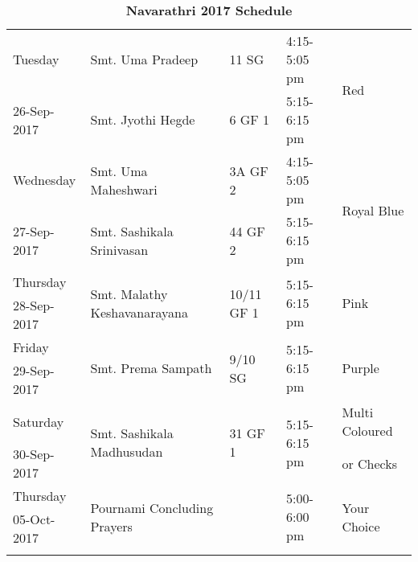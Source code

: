 \documentclass[12pt]{article}
\begin{document}
\begin{center}
\begin{longtable}{|p{}|p{}|p{}|p{}|p{}|}
Tuesday &Smt. Uma Pradeep&11 SG&4:15-5:05 pm&\multirow{2}{*}{Red}\\\cline{2-4}
26-Sep-2017&Smt. Jyothi Hegde&6 GF 1&5:15-6:15 pm&\\\hline

Wednesday &Smt. Uma Maheshwari&3A GF 2&4:15-5:05 pm&\multirow{2}{*}{Royal Blue}\\\cline{2-4}
27-Sep-2017&Smt. Sashikala Srinivasan&44 GF 2&5:15-6:15 pm&\\\hline

Thursday&\multirow{2}{*}{Smt. Malathy Keshavanarayana}&\multirow{2}{*}{10/11 GF 1}&\multirow{2}{*}{5:15-6:15 pm}&\multirow{2}{*}{Pink}\\
28-Sep-2017&&&&\\\hline

Friday&\multirow{2}{*}{Smt. Prema Sampath}&\multirow{2}{*}{9/10 SG}&\multirow{2}{*}{5:15-6:15 pm}&\multirow{2}{*}{Purple}\\
29-Sep-2017&&&&\\\hline

Saturday&\multirow{2}{*}{Smt. Sashikala Madhusudan}&\multirow{2}{*}{31 GF 1}&\multirow{2}{*}{5:15-6:15 pm}&Multi Coloured\\
30-Sep-2017&&&&or Checks\\\hline

Thursday&\multirow{2}{*}{Pournami Concluding Prayers}&\multirow{2}{*}{}&\multirow{2}{*}{5:00-6:00 pm}&\multirow{2}{*}{Your Choice}\\
05-Oct-2017&&&&\\\hline

\caption*{\textbf{Navarathri 2017 Schedule}}
\label{table:programme2017}
\end{longtable}
\end{center}
\end{document}
